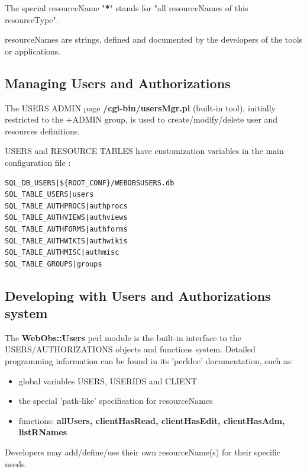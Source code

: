 The special resourceName "\textbf{*}" stands for "all resourceNames of this resourceType".

resourceNames are strings, defined and documented by the developers of the \webobs tools or applications.

\subsection{Managing Users and Authorizations}

The USERS ADMIN page \textbf{/cgi-bin/usersMgr.pl} (built-in tool), initially restricted to the +ADMIN group, is used to create/modify/delete user and resources definitions.

USERS and RESOURCE TABLES have customization variables in the main configuration file :

\begin{lstlisting}[title=\wofile{WEBOBS.rc} (excerpt)]
SQL_DB_USERS|${ROOT_CONF}/WEBOBSUSERS.db
SQL_TABLE_USERS|users
SQL_TABLE_AUTHPROCS|authprocs
SQL_TABLE_AUTHVIEWS|authviews
SQL_TABLE_AUTHFORMS|authforms
SQL_TABLE_AUTHWIKIS|authwikis
SQL_TABLE_AUTHMISC|authmisc
SQL_TABLE_GROUPS|groups
\end{lstlisting}

\subsection{Developing with Users and Authorizations system}

The \textbf{WebObs::Users} perl module is the built-in interface to the USERS/AUTHORIZATIONS objects and functions system.
Detailed programming information can be found in its 'perldoc' documentation, such as:

\begin{itemize}
\item   global variables USERS, USERIDS and CLIENT
\item   the special 'path-like' specification for resourceNames
\item   functions: \textbf{allUsers, clientHasRead, clientHasEdit, clientHasAdm, listRNames}
\end{itemize}

Developers may add/define/use their own resourceName(s) for their specific needs.


